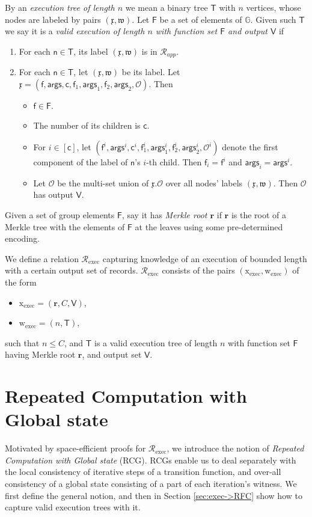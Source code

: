 \documentclass[11pt]{article} %
\newcommand{\Patrick}[1]{\textcolor{blue}{{\bf Patrick}: #1}}
\newcommand{\G}{\ensuremath{{\mathbb G}}\xspace}
\newcommand{\rel}{\ensuremath{\mathcal{R}}\xspace}
\newcommand{\f}{\ensuremath{\mathsf{f}}\xspace}
\newcommand{\relapp}{\ensuremath{\rel_{app}}\xspace}
\newcommand{\relexec}{\ensuremath{\rel_{\mathrm{exec}}}\xspace}
\newcommand{\ops}{\ensuremath{\mathcal{O}}\xspace}
\newcommand{\instapp}{\ensuremath{\mathfrak{x}}\xspace}
\newcommand{\witapp}{\ensuremath{\mathfrak{w}}\xspace}
\renewcommand{\root}{\ensuremath{\mathbf{r}}\xspace}
\newcommand{\funcs}{\ensuremath{\mathsf{F}}\xspace}
\newcommand{\instexec}{\ensuremath{\mathrm{x_{exec}}}\xspace}
\newcommand{\witexec}{\ensuremath{\mathrm{w_{exec}}}\xspace}
\newcommand{\args}{\ensuremath{\mathsf{args}}\xspace}
\newcommand{\callnum}{\ensuremath{\mathsf{c}}\xspace}
\newcommand{\recset}{\ensuremath{\mathsf{V}}\xspace}
\newcommand{\tree}{\ensuremath{\mathsf{T}}\xspace}
\newcommand{\node}{\ensuremath{\mathsf{n}}\xspace}
\begin{document}
By an \emph{execution tree of length $n$} we mean a binary tree \tree with $n$ vertices, whose nodes are
labeled by pairs $(\instapp,\witapp)$.
Let \funcs be a set of elements of \G.
Given such \tree we say it is a \emph{valid execution of length $n$ with function set \funcs and output \recset} if
\begin{enumerate}
 \item For each $\node\in\tree$, its label $(\instapp,\witapp)$ is in \relapp.
    \item For each $\node\in \tree$, let $(\instapp,\witapp)$ be its label. Let
$\instapp= (\f,\args,\callnum, \f_1,\args_1, \f_2,\args_2,\ops)$. Then
    \begin{itemize}
    \item $\f\in \funcs$.
     \item The number of its children is \callnum.
     \item For $i\in [\callnum]$, let $(\f^i,\args^i,\callnum^i, \f^i_1,\args^i_1, \f^i_2,\args^i_2,\ops^i)$ denote the first component of the label of $\node$'s $i$-th child. Then $\f_i=\f^i$ and $\args_i=\args^i$.
     \item Let \ops be the multi-set union of $\instapp.\ops$ over all nodes' labels $(\instapp,\witapp)$. Then \ops has output \recset.
    \end{itemize}
\end{enumerate}
Given a set of group elements \funcs, say it has \emph{Merkle root \root} if \root is the root of a Merkle tree with the elements of \funcs at the leaves using some pre-determined encoding.

We define a relation \relexec capturing knowledge of an execution of bounded length with a certain output set of records.
$\relexec$ consists of the pairs $(\instexec,\witexec)$
of the form
\begin{itemize}
 \item $\instexec=(\root,C,\recset)$,
 \item $\witexec=(n,\tree)$,
\end{itemize}
such that $n\leq C$, and \tree is a valid execution tree of length $n$ with function set \funcs having Merkle root \root, and output set \recset.

\section{Repeated Computation with Global state}\label{sec:RCG}
Motivated by space-efficient proofs for \relexec, we introduce the notion of \emph{Repeated Computation with
Global state} (RCG).
RCGs enable us to deal separately with the local consistency of iterative steps of a transition function,
and over-all consistency of a global state consisting of a part of each iteration's witness.
We first define the general notion, and then in Section \ref{sec:exec->RFC} show how to capture valid execution trees with it.
\end{document}
